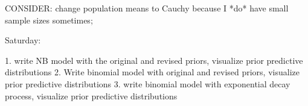 \documentclass[12pt, oneside, titlepage]{article}   	%
\begin{document}
CONSIDER: change population means to Cauchy because I *do* have small sample sizes sometimes; 

Saturday:

1. write NB model with the original and revised priors, visualize prior predictive distributions
2. Write binomial model with original and revised priors, visualize prior predictive distributions
3. write binomial model with exponential decay process, visualize prior predictive distributions

\fi




%



\end{document}
